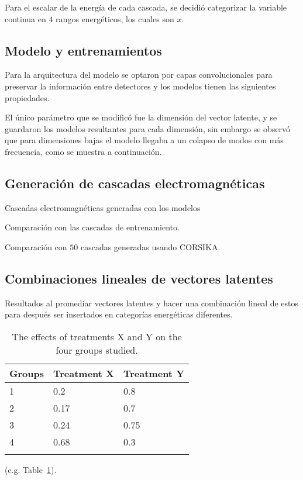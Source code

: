 
Para el escalar de la energía de cada cascada, se decidió categorizar la variable continua en $4$ rangos energéticos, los cuales son $x$.


\subsection*{Modelo y entrenamientos}

Para la arquitectura del modelo se optaron por capas convolucionales para preservar la información entre detectores y los modelos tienen las siguientes propiedades.

El único parámetro que se modificó fue la dimensión del vector latente, y se guardaron los modelos resultantes para cada dimensión, sin embargo se observó que para dimensiones bajas el modelo llegaba a un colapso de modos con más frecuencia, como se muestra a continuación. 


\subsection*{Generación de cascadas electromagnéticas}

Cascadas electromagnéticas generadas con los modelos 


Comparación con las cascadas de entrenamiento.

Comparación con $50$ cascadas generadas usando CORSIKA.

\subsection*{Combinaciones lineales de vectores latentes}

Resultados al promediar vectores latentes y hacer una combinación lineal de estos para después ser insertados en categorías energéticas diferentes.


\begin{table}
    \caption{The effects of treatments X and Y on the four groups studied.}
    \label{tab:treatments}
    \centering
    \begin{tabular}{l l l}
        \toprule
        \textbf{Groups} & \textbf{Treatment X} & \textbf{Treatment Y} \\
        \midrule
        1 & 0.2 & 0.8\\
        2 & 0.17 & 0.7\\
        3 & 0.24 & 0.75\\
        4 & 0.68 & 0.3\\
        \bottomrule\\
    \end{tabular}
\end{table}

(e.g. Table~\ref{tab:treatments}).



